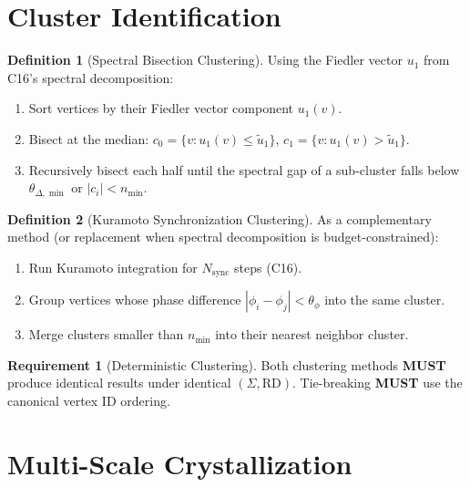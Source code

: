 \documentclass[11pt,a4paper,twoside]{article}
\theoremstyle{definition}
\newtheorem{definition}{Definition}[section]
\newtheorem{requirement}{Requirement}[section]
\theoremstyle{plain}
\theoremstyle{remark}
\newcommand{\abs}[1]{\left\lvert #1 \right\rvert}
\begin{document}
\section{Cluster Identification}\label{sec:clustering}

\begin{definition}[Spectral Bisection Clustering]\label{def:speccluster}
Using the Fiedler vector $u_1$ from C16's spectral decomposition:
\begin{enumerate}[nosep]
  \item Sort vertices by their Fiedler vector component $u_1(v)$.
  \item Bisect at the median: $c_0 = \{v : u_1(v) \le \tilde{u}_1\}$,
        $c_1 = \{v : u_1(v) > \tilde{u}_1\}$.
  \item Recursively bisect each half until the spectral gap of a
        sub-cluster falls below $\theta_{\Delta,\min}$ or
        $\abs{c_i} < n_{\min}$.
\end{enumerate}
\end{definition}

\begin{definition}[Kuramoto Synchronization Clustering]\label{def:kuramcluster}
As a complementary method (or replacement when spectral decomposition
is budget-constrained):
\begin{enumerate}[nosep]
  \item Run Kuramoto integration for $N_{\mathrm{sync}}$ steps (C16).
  \item Group vertices whose phase difference
        $\abs{\phi_i - \phi_j} < \theta_\phi$ into the same cluster.
  \item Merge clusters smaller than $n_{\min}$ into their nearest
        neighbor cluster.
\end{enumerate}
\end{definition}

\begin{requirement}[Deterministic Clustering]\label{req:detcluster}
Both clustering methods \textbf{MUST} produce identical results under
identical $(\Sigma, \mathrm{RD})$. Tie-breaking \textbf{MUST} use the
canonical vertex ID ordering.
\end{requirement}


\section{Multi-Scale Crystallization}\label{sec:mscrystal}
\end{document}
